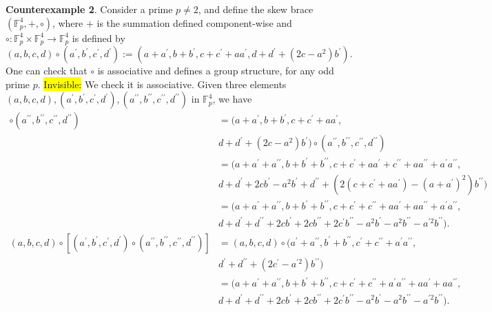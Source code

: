 \documentclass{amsart}
\theoremstyle{definition}
\newenvironment{invisible}{{\noindent\sc \colorbox{yellow}{Invisible:}\;}\color{gray}}{\medskip}
\begin{document}
\noindent\textbf{Counterexample 2}. Consider a prime $p\not=2$, and define the skew brace $(\mathbb{F}_p^4,+,\circ)$, where $+$ is the summation defined component-wise and 
$\circ: \mathbb{F}_p^4 \times \mathbb{F}_p^4 \longrightarrow \mathbb{F}_p^4$ is defined by
\[
(a,b,c,d)\circ(a^\prime,b^\prime,c^\prime,d^\prime):=(a+a^\prime, b + b^\prime, c+c^\prime+aa^\prime, d+d^\prime+(2c-a^2)b^\prime).
\]
One can check that $\circ$ is associative and defines a group structure, for any odd prime $p$. 
\begin{invisible}
We check it is associative.
Given three elements $(a,b,c,d),(a^\prime,b^\prime,c^\prime,d^\prime),(a^{\prime\prime},b^{\prime\prime},c^{\prime\prime},d^{\prime\prime})$ in $\mathbb{F}^4_p$, we have
    \begin{align*}
        [(a,b,c,d)\circ(a^\prime,b^\prime,c^\prime,d^\prime)]\circ (a^{\prime\prime},b^{\prime\prime},c^{\prime\prime},d^{\prime\prime}) &= (a+a^\prime, b + b^\prime, c+c^\prime+aa^\prime,\\
        &d+d^\prime+(2c-a^2)b^\prime) \circ (a^{\prime\prime},b^{\prime\prime},c^{\prime\prime},d^{\prime\prime}) \\
        &=(a+a^\prime+a^{\prime\prime},b+b^\prime+b^{\prime\prime}, c+c^\prime+aa^\prime+c^{\prime\prime}+aa^{\prime\prime}+a^\prime a^{\prime\prime},\\
        &d+d^\prime+2cb^\prime -a^2 b^\prime +d^{\prime\prime}+ (2(c+c^\prime +aa^\prime)-(a+a^\prime)^2)b^{\prime\prime})\\
        &= (a+a^\prime+a^{\prime\prime},b+b^\prime+b^{\prime\prime}, c+c^\prime+c^{\prime\prime}+aa^\prime+ aa^{\prime\prime}+a^\prime a^{\prime\prime},\\
        &d+d^\prime+d^{\prime\prime}+2cb^\prime+2cb^{\prime\prime}+2c^\prime b^{\prime\prime}-a^2b^\prime -a^2b^{\prime\prime}-a^{\prime 2}b^{\prime\prime}).\\
        (a,b,c,d)\circ[(a^\prime,b^\prime,c^\prime,d^\prime)\circ (a^{\prime\prime},b^{\prime\prime},c^{\prime\prime},d^{\prime\prime})] &= (a,b,c,d) \circ (a^\prime+ a^{\prime\prime},b^\prime + b^{\prime\prime}, c^\prime+c^{\prime\prime}+a^\prime a^{\prime\prime},\\
        & d^\prime +d^{\prime\prime}+(2c^\prime -a^{\prime 2})b^{\prime\prime}) \\
        &= (a+ a^\prime+ a^{\prime\prime},b+b^\prime + b^{\prime\prime}, c+ c^\prime+c^{\prime\prime}+a^\prime a^{\prime\prime}+aa^\prime + aa^{\prime \prime},\\
        & d+d^\prime+d^{\prime\prime}+2cb^\prime+2cb^{\prime\prime}+2c^\prime b^{\prime\prime}-a^2b^\prime -a^2b^{\prime\prime}-a^{\prime 2}b^{\prime\prime}).
    \end{align*}
\end{invisible}
\end{document}
